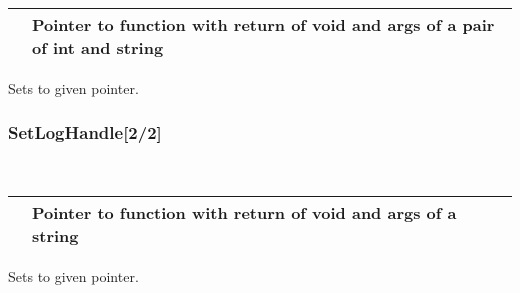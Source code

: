 \documentclass[letterpaper,10pt,english]{sphinxmanual}
\begin{document}
\begin{fulllineitems}
\label{\detokenize{log:_CPPv2N6pessum12SetLogHandleEPFvNSt4pairIiNSt6stringEEEE}}%
\pysigstartmultiline
{}%
\pysigstopmultiline~

\begin{savenotes}\sphinxattablestart
\centering
\begin{tabulary}{\linewidth}[t]{|T|T|}
\hline

&
Pointer to function with return of void and args of a pair of int and string
\\
\hline
\end{tabulary}
\par
\sphinxattableend\end{savenotes}

Sets {\hyperref[\detokenize{log:_CPPv2N6pessum15log_handle_fullE}]{}} to given pointer.

\end{fulllineitems}



\subsubsection{SetLogHandle{[}2/2{]}}
\label{\detokenize{log:setloghandle-2-2}}

\begin{fulllineitems}
\label{\detokenize{log:_CPPv2N6pessum12SetLogHandleEPFvNSt6stringEE}}%
\pysigstartmultiline
{}%
\pysigstopmultiline~

\begin{savenotes}\sphinxattablestart
\centering
\begin{tabulary}{\linewidth}[t]{|T|T|}
\hline

&
Pointer to function with return of void and args of a string
\\
\hline
\end{tabulary}
\par
\sphinxattableend\end{savenotes}

Sets {\hyperref[\detokenize{log:_CPPv2N6pessum10log_handleE}]{}} to given pointer.

\end{fulllineitems}
\end{document}
